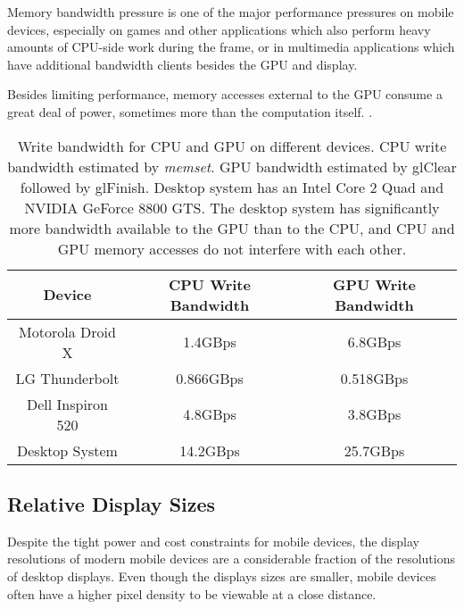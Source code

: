 
Memory bandwidth pressure is one of the major performance pressures on mobile
devices, especially on games and other applications which also perform heavy
amounts of CPU-side work during the frame, or in multimedia applications which
have additional bandwidth clients besides the GPU and display.

Besides limiting performance, memory accesses external to the GPU consume a
great deal of power, sometimes more than the computation itself.
\cite{Antochi04}.

\begin{table}[htb]\centering \begin{tabular}{|c|c|c|} 
\hline \small{Device} & \small{CPU Write Bandwidth} & \small{GPU Write Bandwidth}   \\ \hline 
\hline \small{Motorola Droid X} & \small{1.4GBps} & \small{6.8GBps} \\ 
\hline \small{LG Thunderbolt} & \small{0.866GBps} & \small{0.518GBps} \\ 
\hline \small{Dell Inspiron 520} & \small{4.8GBps} & \small{3.8GBps} \\ 
\hline \small{Desktop System} & \small{14.2GBps} & \small{25.7GBps}\\
\hline
\end{tabular} 
\caption{Write bandwidth for CPU and GPU on different devices.  CPU write
bandwidth estimated by \textit{memset}.  GPU bandwidth estimated by glClear
followed by glFinish.  Desktop system has an Intel Core 2 Quad and NVIDIA
GeForce 8800 GTS.  The desktop system has significantly more bandwidth
available to the GPU than to the CPU, and CPU and GPU memory accesses do not
interfere with each other.}
\label{JonMcCaffrey:bandwidth} \end{table}

\subsection{Relative Display Sizes}\label{Jon-McCaffrey:relative-display-sizes}

 

Despite the tight power and cost constraints for mobile devices, the display
resolutions of modern mobile devices are a considerable fraction of the
resolutions of desktop displays.  Even though the displays sizes are smaller,
mobile devices often have a higher pixel density to be viewable at a close
distance.

